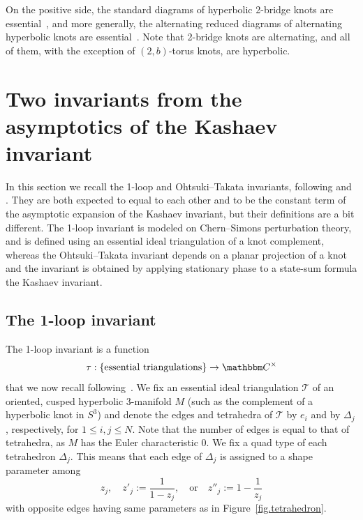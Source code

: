\documentclass[12pt,reqno]{amsart}
\theoremstyle{definition}
\def\BC{\mathbbm C}
\def\calT{\mathcal T}
\def\be{\begin{equation}}
\def\ee{\end{equation}}
\begin{document}
On the positive side, the standard diagrams of hyperbolic 2-bridge knots are
essential~\cite{OT2015}, and more generally, the alternating reduced
diagrams of alternating hyperbolic knots are essential~\cite{GMT,SY}. Note that
2-bridge knots are alternating, and all of them, with the exception of $(2,b)$-torus
knots, are hyperbolic.


\section{Two invariants from the asymptotics of the Kashaev invariant}
\label{sec.prelim}

In this section we recall the 1-loop and Ohtsuki--Takata invariants, 
following \cite{DG1} and \cite{OT2015}. They are both expected to equal to each other
and to be the constant term of the asymptotic expansion of the Kashaev invariant, but
their definitions are a bit different. The 1-loop invariant is modeled on Chern--Simons
perturbation theory, and is defined using an essential ideal triangulation of a
knot complement, whereas the Ohtsuki--Takata invariant depends on a planar projection
of a knot and the invariant is obtained by applying stationary phase to a state-sum
formula the Kashaev invariant.

\subsection{The 1-loop invariant}
\label{sec.OL}

The 1-loop invariant is a function
\be
\tau : \{ \text{essential triangulations} \} \to \BC^\times
\ee
that we now recall following~\cite{DG1}. We fix an essential ideal triangulation
$\calT$ of an oriented, cusped hyperbolic 3-manifold $M$ (such as the complement
of a hyperbolic knot in $S^3$) and denote the edges and tetrahedra of $\calT$ by
$e_i$ and by $\Delta_j$, respectively, for $1 \leq i,j \leq N$. Note that the number of
edges is equal to that of tetrahedra, as $M$ has the Euler
characteristic 0. We fix a quad type of each tetrahedron $\Delta_j$. This 
means that each edge of $\Delta_j$ is assigned to a shape parameter among 
\begin{equation*}
z_j, \quad z'_j:=\frac{1}{1-z_j}, \quad \textrm{or} \quad z''_j:=1- \frac{1}{z_j}
\end{equation*}
with opposite edges having same parameters as in Figure~\ref{fig.tetrahedron}. 
\end{document}
